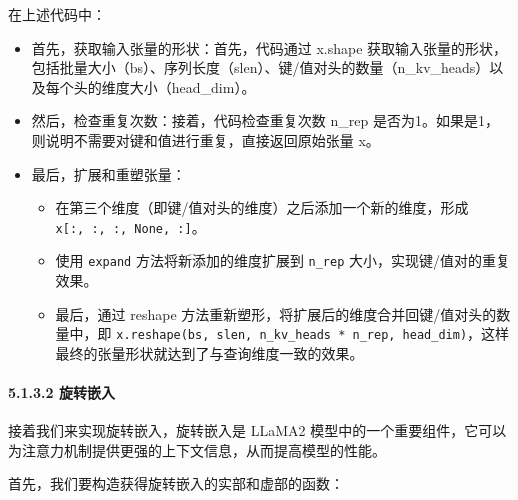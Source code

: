 \documentclass[12pt,a4paper]{book}
\begin{document}
在上述代码中：

\begin{itemize}
\item
  首先，获取输入张量的形状：首先，代码通过 x.shape
  获取输入张量的形状，包括批量大小（bs）、序列长度（slen）、键/值对头的数量（n\_kv\_heads）以及每个头的维度大小（head\_dim）。
\item
  然后，检查重复次数：接着，代码检查重复次数 n\_rep
  是否为1。如果是1，则说明不需要对键和值进行重复，直接返回原始张量 x。
\item
  最后，扩展和重塑张量：

  \begin{itemize}
  \tightlist
  \item
    在第三个维度（即键/值对头的维度）之后添加一个新的维度，形成
    \texttt{x{[}:,\ :,\ :,\ None,\ :{]}}。
  \item
    使用 \texttt{expand} 方法将新添加的维度扩展到 \texttt{n\_rep}
    大小，实现键/值对的重复效果。
  \item
    最后，通过 reshape
    方法重新塑形，将扩展后的维度合并回键/值对头的数量中，即
    \texttt{x.reshape(bs,\ slen,\ n\_kv\_heads\ *\ n\_rep,\ head\_dim)}，这样最终的张量形状就达到了与查询维度一致的效果。
  \end{itemize}
\end{itemize}

\paragraph{5.1.3.2 旋转嵌入}\label{ux65cbux8f6cux5d4cux5165}

接着我们来实现旋转嵌入，旋转嵌入是 LLaMA2
模型中的一个重要组件，它可以为注意力机制提供更强的上下文信息，从而提高模型的性能。

首先，我们要构造获得旋转嵌入的实部和虚部的函数：
\end{document}
